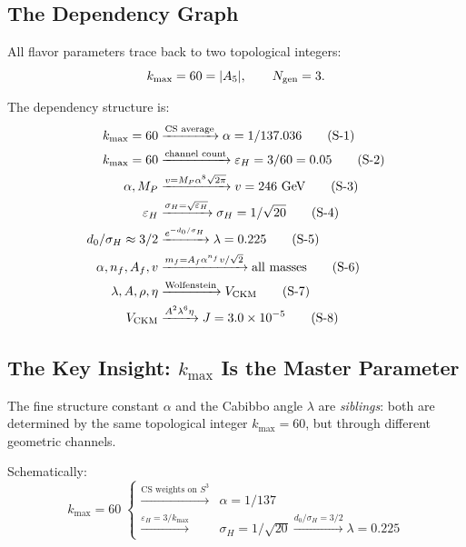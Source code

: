 \documentclass[11pt]{article}
\theoremstyle{remark}
\begin{document}
\subsection{The Dependency Graph}

All flavor parameters trace back to two topological integers:
\begin{equation}
k_{\max} = 60 = |A_5|, \qquad N_{\rm gen} = 3.
\end{equation}

The dependency structure is:
\begin{align}
k_{\max} = 60 &\xrightarrow{\text{CS average}} \alpha = 1/137.036 \tag{S-1} \\
k_{\max} = 60 &\xrightarrow{\text{channel count}} \varepsilon_H = 3/60 = 0.05 \tag{S-2} \\
\alpha, M_P &\xrightarrow{v = M_P\alpha^8\sqrt{2\pi}} v = 246 \text{ GeV} \tag{S-3} \\
\varepsilon_H &\xrightarrow{\sigma_H = \sqrt{\varepsilon_H}} \sigma_H = 1/\sqrt{20} \tag{S-4} \\
d_0/\sigma_H \approx 3/2 &\xrightarrow{e^{-d_0/\sigma_H}} \lambda = 0.225 \tag{S-5} \\
\alpha, n_f, A_f, v &\xrightarrow{m_f = A_f\alpha^{n_f}v/\sqrt{2}} \text{all masses} \tag{S-6} \\
\lambda, A, \rho, \eta &\xrightarrow{\text{Wolfenstein}} V_{\rm CKM} \tag{S-7} \\
V_{\rm CKM} &\xrightarrow{A^2\lambda^6\eta} J = 3.0 \times 10^{-5} \tag{S-8}
\end{align}

\subsection{The Key Insight: $k_{\max}$ Is the Master Parameter}

The fine structure constant $\alpha$ and the Cabibbo angle $\lambda$
are \emph{siblings}: both are determined by the same topological
integer $k_{\max} = 60$, but through different geometric channels.

\begin{center}
\begin{tikzpicture}[scale=1.0]
\end{tikzpicture}
\end{center}

Schematically:
\begin{equation}
k_{\max} = 60 \;\begin{cases}
\xrightarrow{\text{CS weights on } S^3} & \alpha = 1/137 \\[6pt]
\xrightarrow{\varepsilon_H = 3/k_{\max}} & \sigma_H = 1/\sqrt{20}
\xrightarrow{d_0/\sigma_H = 3/2} \lambda = 0.225
\end{cases}
\end{equation}
\end{document}
